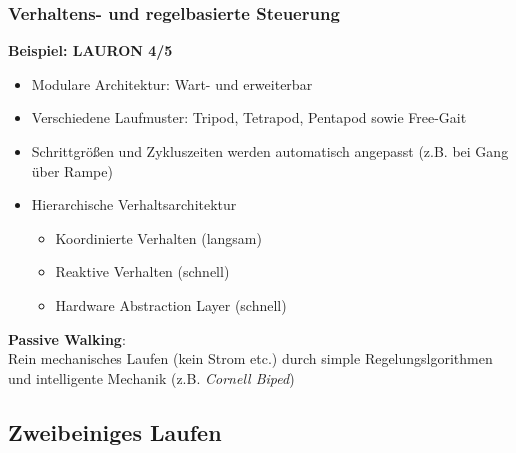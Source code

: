 \subsubsection{Verhaltens- und regelbasierte Steuerung}
\textbf{Beispiel: LAURON 4/5}
\begin{itemize}
\item Modulare Architektur: Wart- und erweiterbar
\item Verschiedene Laufmuster: Tripod, Tetrapod, Pentapod sowie Free-Gait
\item Schrittgrößen und Zykluszeiten werden automatisch angepasst (z.B. bei Gang über Rampe)
\item Hierarchische Verhaltsarchitektur
\begin{itemize}
\item Koordinierte Verhalten (langsam)
\item Reaktive Verhalten (schnell)
\item Hardware Abstraction Layer (schnell)
\end{itemize}
\end{itemize}
\textbf{Passive Walking}:\\
Rein mechanisches Laufen (kein Strom etc.) durch simple Regelungslgorithmen und intelligente Mechanik (z.B. \textit{Cornell Biped})
\subsection{Zweibeiniges Laufen}
